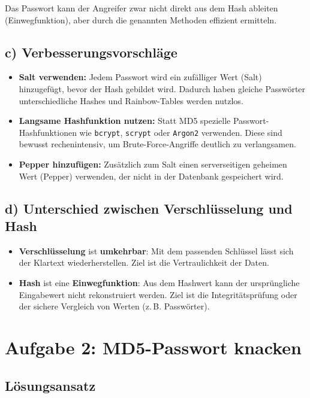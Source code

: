 \documentclass[
	fontsize=12pt,
	paper=a4,
	numbers=noenddot,
	listof=totoc,
	listof=entryprefix,
	listof=nochaptergap,
	bibliography=totoc,
	parskip=half,
	openany
]{scrbook}
\begin{document}
Das Passwort kann der Angreifer zwar nicht direkt aus dem Hash ableiten (Einwegfunktion), aber durch die genannten Methoden effizient ermitteln.

\section*{c) Verbesserungsvorschläge}

\begin{itemize}
	\item \textbf{Salt verwenden:} Jedem Passwort wird ein zufälliger Wert (Salt) hinzugefügt, bevor der Hash gebildet wird.
	      Dadurch haben gleiche Passwörter unterschiedliche Hashes und Rainbow-Tables werden nutzlos.
	\item \textbf{Langsame Hashfunktion nutzen:} Statt MD5 spezielle Passwort-Hashfunktionen wie \texttt{bcrypt}, \texttt{scrypt} oder \texttt{Argon2} verwenden.
	      Diese sind bewusst rechenintensiv, um Brute-Force-Angriffe deutlich zu verlangsamen.
	\item \textbf{Pepper hinzufügen:} Zusätzlich zum Salt einen serverseitigen geheimen Wert (Pepper) verwenden, der nicht in der Datenbank gespeichert wird.
\end{itemize}

\section*{d) Unterschied zwischen Verschlüsselung und Hash}

\begin{itemize}
	\item \textbf{Verschlüsselung} ist \textbf{umkehrbar}: Mit dem passenden Schlüssel lässt sich der Klartext wiederherstellen.
	      Ziel ist die Vertraulichkeit der Daten.
	\item \textbf{Hash} ist eine \textbf{Einwegfunktion}: Aus dem Hashwert kann der ursprüngliche Eingabewert nicht rekonstruiert werden.
	      Ziel ist die Integritätsprüfung oder der sichere Vergleich von Werten (z.\,B. Passwörter).
\end{itemize}


\chapter*{Aufgabe 2: MD5-Passwort knacken}

\section*{Lösungsansatz}
\end{document}
